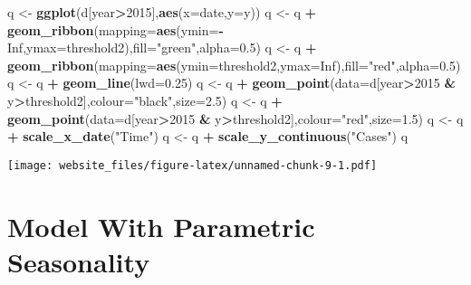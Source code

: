 \documentclass[]{book}
\newenvironment{Shaded}{\begin{snugshade}}{\end{snugshade}}
\newcommand{\KeywordTok}[1]{\textcolor[rgb]{0.13,0.29,0.53}{\textbf{#1}}}
\newcommand{\DataTypeTok}[1]{\textcolor[rgb]{0.13,0.29,0.53}{#1}}
\newcommand{\DecValTok}[1]{\textcolor[rgb]{0.00,0.00,0.81}{#1}}
\newcommand{\FloatTok}[1]{\textcolor[rgb]{0.00,0.00,0.81}{#1}}
\newcommand{\StringTok}[1]{\textcolor[rgb]{0.31,0.60,0.02}{#1}}
\newcommand{\OtherTok}[1]{\textcolor[rgb]{0.56,0.35,0.01}{#1}}
\newcommand{\OperatorTok}[1]{\textcolor[rgb]{0.81,0.36,0.00}{\textbf{#1}}}
\newcommand{\NormalTok}[1]{#1}
\begin{document}
\begin{Shaded}
\begin{Highlighting}[]
\NormalTok{q <-}\StringTok{ }\KeywordTok{ggplot}\NormalTok{(d[year}\OperatorTok{>}\DecValTok{2015}\NormalTok{],}\KeywordTok{aes}\NormalTok{(}\DataTypeTok{x=}\NormalTok{date,}\DataTypeTok{y=}\NormalTok{y))}
\NormalTok{q <-}\StringTok{ }\NormalTok{q }\OperatorTok{+}\StringTok{ }\KeywordTok{geom_ribbon}\NormalTok{(}\DataTypeTok{mapping=}\KeywordTok{aes}\NormalTok{(}\DataTypeTok{ymin=}\OperatorTok{-}\OtherTok{Inf}\NormalTok{,}\DataTypeTok{ymax=}\NormalTok{threshold2),}\DataTypeTok{fill=}\StringTok{"green"}\NormalTok{,}\DataTypeTok{alpha=}\FloatTok{0.5}\NormalTok{)}
\NormalTok{q <-}\StringTok{ }\NormalTok{q }\OperatorTok{+}\StringTok{ }\KeywordTok{geom_ribbon}\NormalTok{(}\DataTypeTok{mapping=}\KeywordTok{aes}\NormalTok{(}\DataTypeTok{ymin=}\NormalTok{threshold2,}\DataTypeTok{ymax=}\OtherTok{Inf}\NormalTok{),}\DataTypeTok{fill=}\StringTok{"red"}\NormalTok{,}\DataTypeTok{alpha=}\FloatTok{0.5}\NormalTok{)}
\NormalTok{q <-}\StringTok{ }\NormalTok{q }\OperatorTok{+}\StringTok{ }\KeywordTok{geom_line}\NormalTok{(}\DataTypeTok{lwd=}\FloatTok{0.25}\NormalTok{)}
\NormalTok{q <-}\StringTok{ }\NormalTok{q }\OperatorTok{+}\StringTok{ }\KeywordTok{geom_point}\NormalTok{(}\DataTypeTok{data=}\NormalTok{d[year}\OperatorTok{>}\DecValTok{2015} \OperatorTok{&}\StringTok{ }\NormalTok{y}\OperatorTok{>}\NormalTok{threshold2],}\DataTypeTok{colour=}\StringTok{"black"}\NormalTok{,}\DataTypeTok{size=}\FloatTok{2.5}\NormalTok{)}
\NormalTok{q <-}\StringTok{ }\NormalTok{q }\OperatorTok{+}\StringTok{ }\KeywordTok{geom_point}\NormalTok{(}\DataTypeTok{data=}\NormalTok{d[year}\OperatorTok{>}\DecValTok{2015} \OperatorTok{&}\StringTok{ }\NormalTok{y}\OperatorTok{>}\NormalTok{threshold2],}\DataTypeTok{colour=}\StringTok{"red"}\NormalTok{,}\DataTypeTok{size=}\FloatTok{1.5}\NormalTok{)}
\NormalTok{q <-}\StringTok{ }\NormalTok{q }\OperatorTok{+}\StringTok{ }\KeywordTok{scale_x_date}\NormalTok{(}\StringTok{"Time"}\NormalTok{)}
\NormalTok{q <-}\StringTok{ }\NormalTok{q }\OperatorTok{+}\StringTok{ }\KeywordTok{scale_y_continuous}\NormalTok{(}\StringTok{"Cases"}\NormalTok{)}
\NormalTok{q}
\end{Highlighting}
\end{Shaded}

\texttt{[image: website\_files/figure-latex/unnamed-chunk-9-1.pdf]}

\section{Model With Parametric
Seasonality}\label{model-with-parametric-seasonality}
\end{document}
